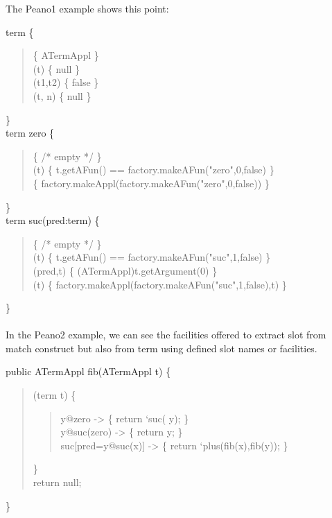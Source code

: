 The Peano1 example shows this point:

\typeterm term \{\\
\begin{quote}
  \implement           \{ ATermAppl \}\\
  \getfs(t)      \{ null \}\\
  \cmpfs(t1,t2)  \{ false \}\\
  \gets(t, n)   \{ null \}\\
\end{quote}
\}\\

\op term zero \{\\
\begin{quote}
  \fsym       \{ \textsf{/* empty */} \}\\
  \isfs(t) \{ t.getAFun() == factory.makeAFun("zero",0,false) \}\\
  \make       \{ factory.makeAppl(factory.makeAFun("zero",0,false)) \}\\
\end{quote}
\}\\
  
\op term suc(pred:term) \{\\
\begin{quote}
  \fsym             \{ \textsf{/* empty */} \}\\
  \isfs(t)       \{ t.getAFun() == factory.makeAFun("suc",1,false) \}\\
  \getslot(pred,t) \{ (ATermAppl)t.getArgument(0) \}\\
  \make(t)          \{ factory.makeAppl(factory.makeAFun("suc",1,false),t) \}\\
\end{quote}
\}\\
\\
In the Peano2 example, we can see the facilities offered to extract
slot from match construct but also from term using defined slot names
or \@ facilities.

public ATermAppl fib(ATermAppl t) \{\\
\begin{quote}
  \match(term t) \{\\
\begin{quote}
    \textsf{y@}zero             -> \{ return `suc( \textsf{y}); \}\\
    \textsf{y@}suc(zero)        -> \{ return \textsf{y}; \}\\
    suc\textsf{[pred=y@}suc(\textsf{x})\textsf{]} -> \{ return `plus(fib(\textsf{x}),fib(\textsf{y})); \}\\
\end{quote}
  \}\\
  return null;\\
\end{quote}
\}\\

